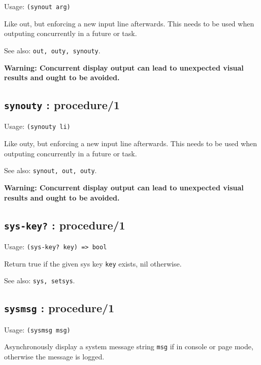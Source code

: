 \documentclass[
]{article}
\newcommand{\passthrough}[1]{#1}
\begin{document}
Usage: \passthrough{\lstinline!(synout arg)!}

Like out, but enforcing a new input line afterwards. This needs to be
used when outputing concurrently in a future or task.

See also: \passthrough{\lstinline!out, outy, synouty!}.

\textbf{Warning: Concurrent display output can lead to unexpected visual
results and ought to be avoided.}

\hypertarget{synouty-procedure1}{%
\subsection{\texorpdfstring{\texttt{synouty} :
procedure/1}{synouty : procedure/1}}\label{synouty-procedure1}}

Usage: \passthrough{\lstinline!(synouty li)!}

Like outy, but enforcing a new input line afterwards. This needs to be
used when outputing concurrently in a future or task.

See also: \passthrough{\lstinline!synout, out, outy!}.

\textbf{Warning: Concurrent display output can lead to unexpected visual
results and ought to be avoided.}

\hypertarget{sys-key-procedure1-1}{%
\subsection{\texorpdfstring{\texttt{sys-key?} :
procedure/1}{sys-key? : procedure/1}}\label{sys-key-procedure1-1}}

Usage: \passthrough{\lstinline!(sys-key? key) => bool!}

Return true if the given sys key \passthrough{\lstinline!key!} exists,
nil otherwise.

See also: \passthrough{\lstinline!sys, setsys!}.

\hypertarget{sysmsg-procedure1-2}{%
\subsection{\texorpdfstring{\texttt{sysmsg} :
procedure/1}{sysmsg : procedure/1}}\label{sysmsg-procedure1-2}}

Usage: \passthrough{\lstinline!(sysmsg msg)!}

Asynchronously display a system message string
\passthrough{\lstinline!msg!} if in console or page mode, otherwise the
message is logged.
\end{document}
